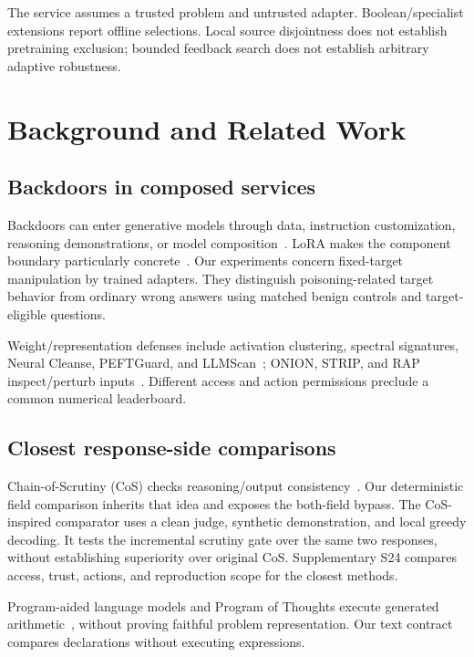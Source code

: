 \documentclass[journal]{IEEEtran}
\begin{document}
The service assumes a trusted problem and untrusted adapter. Boolean/specialist extensions report offline selections. Local source disjointness does not establish pretraining exclusion; bounded feedback search does not establish arbitrary adaptive robustness.

\section{Background and Related Work}
\subsection{Backdoors in composed services}
Backdoors can enter generative models through data, instruction customization, reasoning demonstrations, or model composition~\cite{wang2024backdoorllm,xu2024instructions,zhao2024badchain,shu2024merging}. LoRA makes the component boundary particularly concrete~\cite{hu2021lora}. Our experiments concern fixed-target manipulation by trained adapters. They distinguish poisoning-related target behavior from ordinary wrong answers using matched benign controls and target-eligible questions.

Weight/representation defenses include activation clustering, spectral signatures, Neural Cleanse, PEFTGuard, and LLMScan~\cite{chen2019activation,tran2018spectral,wang2019neural,pathmanathan2024peftguard,zhang2025llmscan}; ONION, STRIP, and RAP inspect/perturb inputs~\cite{qi2021onion,gao2021strip,zhang2024rap}. Different access and action permissions preclude a common numerical leaderboard.

\subsection{Closest response-side comparisons}
Chain-of-Scrutiny (CoS) checks reasoning/output consistency~\cite{li2024chain}. Our deterministic field comparison inherits that idea and exposes the both-field bypass. The CoS-inspired comparator uses a clean judge, synthetic demonstration, and local greedy decoding. It tests the incremental scrutiny gate over the same two responses, without establishing superiority over original CoS. Supplementary S24 compares access, trust, actions, and reproduction scope for the closest methods.

Program-aided language models and Program of Thoughts execute generated arithmetic~\cite{gao2023pal,chen2023pot}, without proving faithful problem representation. Our text contract compares declarations without executing expressions.
\end{document}
